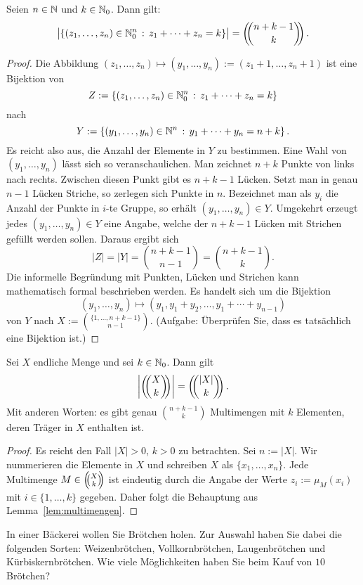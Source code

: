 \begin{lem} \label{lem:multimengen}
	Seien $n \in \mathbb{N}$ und $k \in \mathbb{N}_0$. Dann gilt: 
	\[
		\bigl| \left\{  (z_1,\ldots,z_n) \in \mathbb{N}_0^n \,:\, z_1 + \cdots + z_n = k \right\} \bigr| = \left(\!\!\binom{n+k-1}{k}\!\!\right). 
	\]
\end{lem} 
\begin{proof} 
	Die Abbildung $(z_1,\ldots,z_n) \mapsto (y_1,\ldots,y_n):=(z_1+1,\ldots,z_n+1)$ ist eine Bijektion von 
	\[
			Z:=\left\{  (z_1,\ldots,z_n) \in \mathbb{N}_0^n \,:\, z_1 + \cdots + z_n = k \right\}
	\]
	nach 
	\[
			Y:= \left\{  (y_1,\ldots,y_n) \in \mathbb{N}^n \,:\, y_1 + \cdots + y_n = n+ k \right\}. 
	\]
	Es reicht also aus, die Anzahl der Elemente in $Y$ zu bestimmen. Eine Wahl von $(y_1,\ldots,y_n)$ lässt sich so veranschaulichen. Man zeichnet $n+k$ Punkte von links nach rechts. Zwischen diesen Punkt gibt es $n+k-1$ Lücken. Setzt man in genau $n-1$ Lücken Striche, so zerlegen sich Punkte in $n$. Bezeichnet man als $y_i$ die Anzahl der Punkte in $i$-te Gruppe, so erhält $(y_1,\ldots,y_n) \in Y$. Umgekehrt erzeugt jedes $(y_1,\ldots,y_n) \in Y$ eine Angabe, welche der $n+k-1$ Lücken mit Strichen gefüllt werden sollen. Daraus ergibt sich 
	\[
			|Z| = |Y|= \binom{n+k-1}{n-1} = \binom{n+k-1}{k}. 
	\]
	Die informelle Begründung mit Punkten, Lücken und Strichen kann mathematisch formal beschrieben werden. Es handelt sich um die Bijektion 
	\[
		(y_1,\ldots,y_n) \mapsto (y_1,y_1+y_2,\ldots, y_1+ \cdots +y_{n-1})
	\] von $Y$ nach 
	\(
			X:=\binom{\{1,\ldots,n+k-1\}}{n-1}. 
	\)
	(Aufgabe: Überprüfen Sie, dass es tatsächlich eine Bijektion ist.) 
\end{proof} 

\begin{thm}
	Sei $X$ endliche Menge und sei $k \in \mathbb{N}_0$. Dann gilt 
	\[
			\left| \mbinom{X}{k} \right| = \mbinom{|X|}{k}. 
	\]
	Mit anderen Worten: es gibt genau $\binom{n+k-1}{k}$ Multimengen mit $k$ Elementen, deren Träger in $X$ enthalten ist. 
\end{thm}
\begin{proof}
	Es reicht den Fall $|X| >0$, $k>0$ zu betrachten. Sei $n:= |X|$. Wir nummerieren die Elemente in $X$ und schreiben $X$ als $\{x_1,\ldots,x_n\}$. Jede Multimenge $M \in \left(\!\!\binom{X}{k}\!\!\right)$ ist eindeutig durch die Angabe der Werte $z_i := \mu_M(x_i)$ mit $i \in \{1,\ldots,k\}$ gegeben. Daher folgt die Behauptung aus Lemma~\ref{lem:multimengen}. 
\end{proof} 

\begin{aufg}
	In einer Bäckerei wollen Sie Brötchen holen. Zur Auswahl haben Sie dabei die folgenden Sorten: Weizenbrötchen, Vollkornbrötchen, Laugenbrötchen und Kürbiskern\-brötchen. Wie viele Möglichkeiten haben Sie beim Kauf von $10$ Brötchen? 
\end{aufg} 

